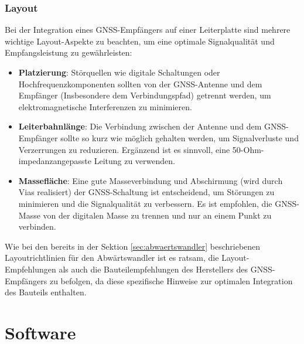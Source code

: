 \subsection{Layout}
\label{subsec:gnss_layout}

Bei der Integration eines GNSS-Empfängers auf einer Leiterplatte sind mehrere wichtige Layout-Aspekte zu beachten, um eine optimale Signalqualität und Empfangsleistung zu gewährleisten:
\begin{itemize}
    \item \textbf{Platzierung}: Störquellen wie digitale Schaltungen oder Hochfrequenzkomponenten sollten von der GNSS-Antenne und dem Empfänger (Insbesondere dem Verbindungspfad) getrennt werden, um elektromagnetische Interferenzen zu minimieren. 
    \item \textbf{Leiterbahnlänge}: Die Verbindung zwischen der Antenne und dem GNSS-Empfänger sollte so kurz wie möglich gehalten werden, um Signalverluste und Verzerrungen zu reduzieren. Ergänzend ist es sinnvoll, eine 50-Ohm-impedanzangepasste Leitung zu verwenden.
    \item \textbf{Massefläche}: Eine gute Masseverbindung und Abschirmung (wird durch Vias realisiert) der GNSS-Schaltung ist entscheidend, um Störungen zu minimieren und die Signalqualität zu verbessern. Es ist empfohlen, die GNSS-Masse von der digitalen Masse zu trennen und nur an einem Punkt zu verbinden.
\end{itemize}
Wie bei den bereits in der Sektion \ref{sec:abwaertswandler} beschriebenen Layoutrichtlinien für den Abwärtswandler ist es ratsam, die Layout-Empfehlungen als auch die Bauteilempfehlungen des Herstellers des GNSS-Empfängers zu befolgen, da diese spezifische Hinweise zur optimalen Integration des Bauteils enthalten.
\parencite{AltiumGPS}



\chapter{Software}
\label{ch:software}

